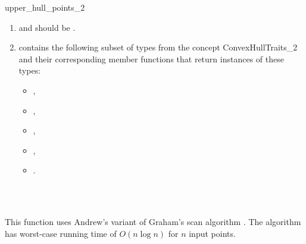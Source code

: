 \begin{ccRefFunction}{upper_hull_points_2}
\begin{enumerate}
   \item    {} and 
            should be .
   \item    {} contains the following subset of types from
            the concept ConvexHullTraits\_2 and their corresponding member
            functions that return instances of these types:
            \begin{itemize}
                \item {},
                \item {}, 
                \item {},
                \item {}, 
                \item {}.
            \end{itemize}
\end{enumerate}

\ccSeeAlso

 \\
 \\

\ccImplementation

This function uses Andrew's
variant of Graham's scan algorithm \cite{a-aeach-79,m-mdscg-84}.  The algorithm
has worst-case running time of  $O(n \log n)$ for $n$ input points.

\end{ccRefFunction}


